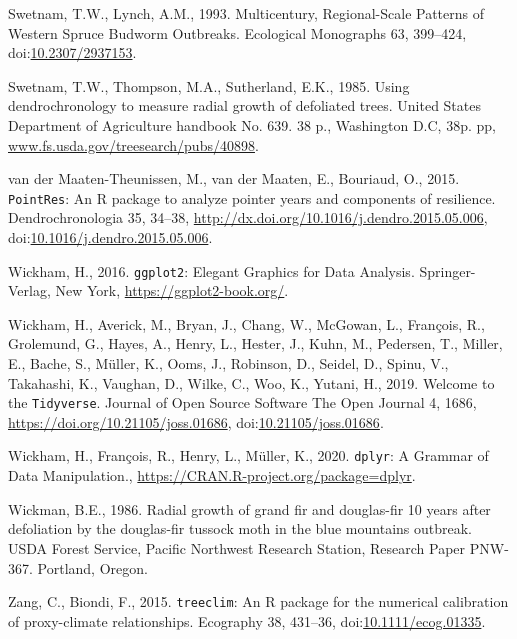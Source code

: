 \documentclass[review]{elsarticle} %
\begin{document}
\leavevmode\hypertarget{ref-Swetnam1993}{}%
Swetnam, T.W., Lynch, A.M., 1993. Multicentury, Regional-Scale Patterns of Western Spruce Budworm Outbreaks. Ecological Monographs 63, 399--424, doi:\href{https://doi.org/10.2307/2937153}{10.2307/2937153}.

\leavevmode\hypertarget{ref-Swetnam1985}{}%
Swetnam, T.W., Thompson, M.A., Sutherland, E.K., 1985. Using dendrochronology to measure radial growth of defoliated trees. United States Department of Agriculture handbook No. 639. 38 p., Washington D.C, 38p. pp, \url{www.fs.usda.gov/treesearch/pubs/40898}.

\leavevmode\hypertarget{ref-VanderMaaten-Theunissen2015}{}%
van der Maaten-Theunissen, M., van der Maaten, E., Bouriaud, O., 2015. \texttt{PointRes}: An R package to analyze pointer years and components of resilience. Dendrochronologia 35, 34--38, \url{http://dx.doi.org/10.1016/j.dendro.2015.05.006}, doi:\href{https://doi.org/10.1016/j.dendro.2015.05.006}{10.1016/j.dendro.2015.05.006}.

\leavevmode\hypertarget{ref-wickham2016ggplot2}{}%
Wickham, H., 2016. \texttt{ggplot2}: Elegant Graphics for Data Analysis. Springer-Verlag, New York, \url{https://ggplot2-book.org/}.

\leavevmode\hypertarget{ref-Wickham2019}{}%
Wickham, H., Averick, M., Bryan, J., Chang, W., McGowan, L., François, R., Grolemund, G., Hayes, A., Henry, L., Hester, J., Kuhn, M., Pedersen, T., Miller, E., Bache, S., Müller, K., Ooms, J., Robinson, D., Seidel, D., Spinu, V., Takahashi, K., Vaughan, D., Wilke, C., Woo, K., Yutani, H., 2019. Welcome to the \texttt{Tidyverse}. Journal of Open Source Software The Open Journal 4, 1686, \url{https://doi.org/10.21105/joss.01686}, doi:\href{https://doi.org/10.21105/joss.01686}{10.21105/joss.01686}.

\leavevmode\hypertarget{ref-Wickham2020dplyr}{}%
Wickham, H., François, R., Henry, L., Müller, K., 2020. \texttt{dplyr}: A Grammar of Data Manipulation., \url{https://CRAN.R-project.org/package=dplyr}.

\leavevmode\hypertarget{ref-Wickman1986}{}%
Wickman, B.E., 1986. Radial growth of grand fir and douglas-fir 10 years after defoliation by the douglas-fir tussock moth in the blue mountains outbreak. USDA Forest Service, Pacific Northwest Research Station, Research Paper PNW-367. Portland, Oregon.

\leavevmode\hypertarget{ref-Zang2015}{}%
Zang, C., Biondi, F., 2015. \texttt{treeclim}: An R package for the numerical calibration of proxy-climate relationships. Ecography 38, 431--36, doi:\href{https://doi.org/10.1111/ecog.01335}{10.1111/ecog.01335}.
\end{document}

